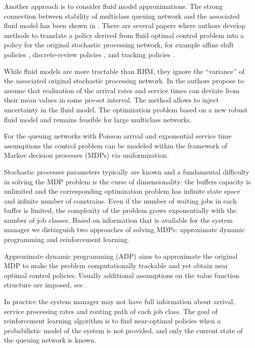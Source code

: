 \documentclass[11pt]{article}
\theoremstyle{definition}
\numberwithin{equation}{section}
\begin{document}
Another approach is to consider fluid model approximations. The strong connection between stability of multiclass queuing network and the associated fluid model has been shown in \cite{Dai1995}. There are several papers where authors develop methods to
translate a policy derived from fluid optimal control problem into a policy for the original stochastic processing network, for example affine shift policies \cite{Meyn1997}, discrete-review policies \cite{Maglaras2000}, and tracking policies \cite{Bauerle2001a}.

 While fluid models are more tractable than RBM, they ignore the ``variance'' of the associated original stochastic processing network.   In \cite{Bertsimas2015} the authors propose to assume that realization
of the arrival rates and service times can deviate from their mean values in some pre-set interval. The method allows to inject uncertainty in the fluid model. The optimization problem  based on a new robust fluid model and remains feasible for large multiclass networks.  



 For the queuing networks with Poisson arrival and exponential service time assumptions the control problem can be modeled within the framework of Markov decision processes (MDPs) via uniformization. 
 
 
 
Stochastic processes parameters typically  are known  and a fundamental difficulty in solving the MDP problem   is the curse of dimensionality: the buffers capacity is unlimited and the corresponding optimization problem has infinite state space and infinite number of constrains. Even if the number of waiting jobs in each buffer is limited, the complexity of the problem grows exponentially with the number of job classes.   Based on information that is available for the system manager we distinguish two approaches of solving MDPs: approximate dynamic programming and reinforcement learning.

 
Approximate dynamic programming (ADP)  aims to approximate the original MDP to make the problem computationally trackable and yet obtain near optimal control policies. Usually additional assumptions on the value function structure are imposed, see \cite{DeFarias2003a, Abbasi_Yadkori2014a, Veatch2015}.

In practice the system manager may not have full information about arrival, service processing rates and routing path of each job class. The goal of  reinforcement learning algorithm is to find near-optimal  policies when a probabilistic model of the system is not provided, and only the current state of the queuing network is known. %
\end{document}
